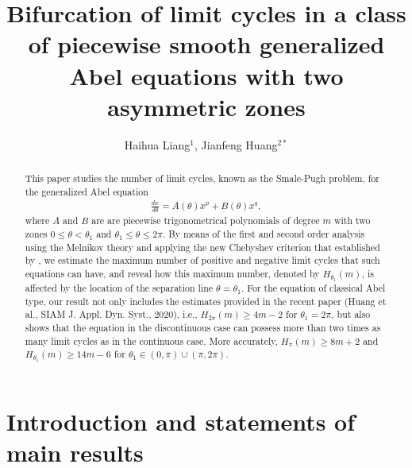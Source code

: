 \documentclass[11pt]{amsart}
\title[piecewise smooth generalized Abel equations with two asymmetric zones]{Bifurcation  of limit cycles in a class of piecewise smooth generalized Abel equations with two asymmetric zones}
\theoremstyle{remark}
\theoremstyle{definition}
\begin{document}
\author[ H.  Liang  and J. Huang]
{Haihua Liang$^1$,  Jianfeng Huang$^{2 *}$}



\address{$^1$
School of Mathematics and Systems Science, Guangdong Polytechnic Normal University,  Guangzhou, 510665, P.R.China}



\address{$^2$    Department of Mathematics,\ Jinan University,\
Guangzhou\ 510632,\ P.R.\ China}
\maketitle



\begin{abstract}
This paper studies the number of limit cycles, known as the Smale-Pugh problem, for the generalized Abel equation
\begin{align*}
  \frac{dx}{d\theta}=A(\theta)x^p+B(\theta)x^q,
\end{align*}
where $A$ and $B$ are are piecewise trigonometrical polynomials of degree $ m $ with two zones $0\leq\theta<\theta_1$ and $\theta_1\leq\theta\leq2\pi$.
By means of the first and second order analysis using the Melnikov theory and applying the new Chebyshev criterion that established by \cite{HLZ2023}, we estimate the maximum number of positive and negative limit cycles that such equations can have, and
reveal how this maximum number, denoted by $H_{\theta_1}(m)$, is affected by the location of the separation line $\theta=\theta_1$. For the equation of classical Abel type, our result not only includes the estimates provided in the recent paper (Huang et al., SIAM J. Appl. Dyn. Syst., 2020), i.e., $H_{2\pi}(m)\geq 4m-2$ for $\theta_1=2\pi$, but also shows that the equation in the discontinuous case can possess  more than two times as many limit cycles as in the continuous case. More accurately, $H_{\pi}(m)\geq 8m+2$  and  $H_{\theta_1}(m)\geq 14m-6$ for $\theta_1\in (0,\pi)\cup (\pi,2\pi)$.

\end{abstract}





\section{Introduction and statements of main results}
\end{document}
